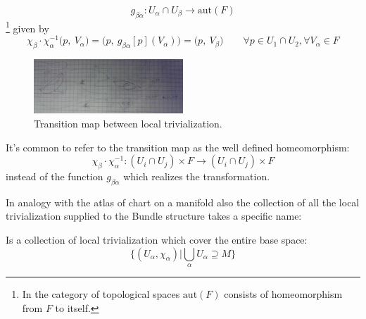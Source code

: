 \documentclass[a4paper,12pt]{scrartcl}    %
\begin{document}
\begin{definition}
\begin{displaymath}
g_{ \beta \alpha}: U_{\alpha} \cap U_{\beta} \rightarrow	\textrm{aut}(F)
\end{displaymath}\footnote{In the category of topological spaces $\textrm{aut}(F) $ consists of homeomorphism from $F$ to itself.}
given by
\begin{displaymath}
\chi_{\beta} \cdot \chi_{\alpha}^{-1} \big(p, \: V_{\alpha}\big) = \big( p, \: g_{ \beta \alpha} [p] (V_{\alpha}) \big )= \big(p, \:  V_{\beta} \big) \qquad \forall p \in U_{1} \cap U_{2} , \forall V_{\alpha} \in F
\end{displaymath}
\end{definition}

\begin{figure}[h!]
  \caption{Transition map between local trivialization.}
  	\includegraphics[width=0.5\textwidth]{TempPictures/TransitionMap.jpg}
  \centering
\end{figure}

\begin{notationfix}
It's common to refer to the transition map as the well defined homeomorphism:
\begin{displaymath}
\chi_{\beta} \cdot \chi_{\alpha}^{-1} :  ( U_{i} \cap U_{j} ) \times F   \rightarrow ( U_{i} \cap U_{j} ) \times F
\end{displaymath}
instead of the function $g_{ \beta \alpha}$ which realizes the transformation.
\end{notationfix}

In analogy with the atlas of chart on a manifold also the collection of all the local trivialization supplied to the Bundle structure takes a specific name:
\begin{definition}
Is a collection of local trivialization which cover the entire base space: 
\begin{displaymath}
\big \{ ( U_{\alpha},\chi_{\alpha} ) \big \vert \bigcup_{\alpha} U_{\alpha} \supseteq M  \big \}
\end{displaymath}
\end{definition}
\end{document}
